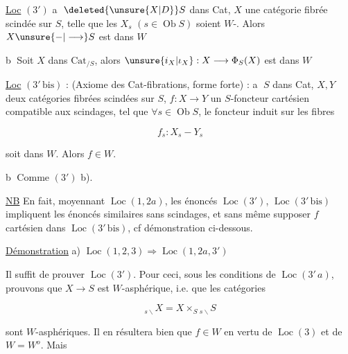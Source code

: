 



\uline{Loc} $(3')$ \textcircled{a}   $\deleted{\unsure{X|D}}S$ dans Cat, $X$ une catégorie fibrée scindée sur $S$, telle que les  $X_s$ $(s\in\operatorname{Ob}S)$ soient $W$-. Alors $X\unsure{{-}|\longrightarrow} S$ est dans $W$

\textcircled{b} Soit $X$ dans $\mathrm{Cat}_{/S}$, alors $\unsure{i_X|\iota_X}:X\longrightarrow\Phi_S(X)$ est dans $W$


\uline{Loc} $(3'\,\mathrm{bis})$ : (Axiome des Cat-fibrations, forme  forte) : \textcircled{a}  $S$ dans Cat, $X,Y$ deux catégories fibrées scindées sur $S$, $f:X\longrightarrow Y$ un $S$-foncteur cartésien compatible aux scindages, tel que $\forall s\in\operatorname{Ob}S$, le foncteur induit sur les fibres

\[
f_s:X_s{-}Y_s
\]

soit dans $W$. Alors $f\in W$.

\textcircled{b} Comme  $(3')$ b).

\uline{NB} En fait, moyennant $\operatorname{Loc}(1,2a)$, les énoncés $\operatorname{Loc}(3')$, $\operatorname{Loc}(3'\,\mathrm{bis})$ impliquent les énoncés similaires sans scindages, et sans même supposer $f$ cartésien dans $\operatorname{Loc}(3'\,\mathrm{bis})$, cf démonstration ci-dessous.

\uline{Démonstration} \qquad a) $\operatorname{Loc}(1,2,3)\Longrightarrow\operatorname{Loc}(1,2a,3')$

Il suffit de prouver $\operatorname{Loc}(3')$.  Pour ceci, sous les conditions de $\operatorname{Loc}(3'\,a)$, prouvons que $X\longrightarrow S$ est $W$-asphérique, i.e. que les catégories

\[
{}_{s\backslash}X=X\times_S{}_{s\backslash}S
\]

sont $W$-asphériques. Il en résultera bien que $f\in W$ en vertu de $\operatorname{Loc}(3)$  et de $W=W^{o}$. Mais

